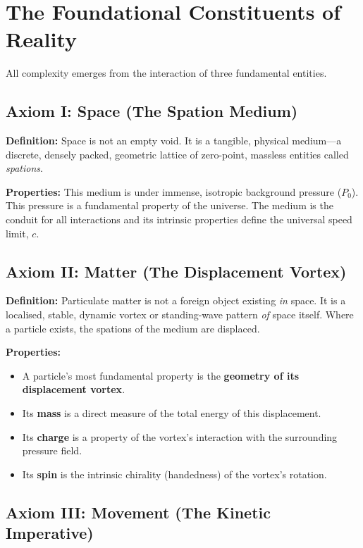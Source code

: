 \section{The Foundational Constituents of Reality}

All complexity emerges from the interaction of three fundamental entities.

\subsection{Axiom I: Space (The Spation Medium)}

\textbf{Definition:} Space is not an empty void.  It is a tangible, physical medium---a discrete, densely packed, geometric lattice of zero-point, massless entities called \emph{spations}.

\textbf{Properties:} This medium is under immense, isotropic background pressure ($P_0$).  This pressure is a fundamental property of the universe.  The medium is the conduit for all interactions and its intrinsic properties define the universal speed limit, $c$.

\subsection{Axiom II: Matter (The Displacement Vortex)}

\textbf{Definition:} Particulate matter is not a foreign object existing \emph{in} space.  It is a localised, stable, dynamic vortex or standing-wave pattern \emph{of} space itself.  Where a particle exists, the spations of the medium are displaced.

\textbf{Properties:}
\begin{itemize}
  \item A particle's most fundamental property is the \textbf{geometry of its displacement vortex}.
  \item Its \textbf{mass} is a direct measure of the total energy of this displacement.
  \item Its \textbf{charge} is a property of the vortex's interaction with the surrounding pressure field.
  \item Its \textbf{spin} is the intrinsic chirality (handedness) of the vortex's rotation.
\end{itemize}

\subsection{Axiom III: Movement (The Kinetic Imperative)}

